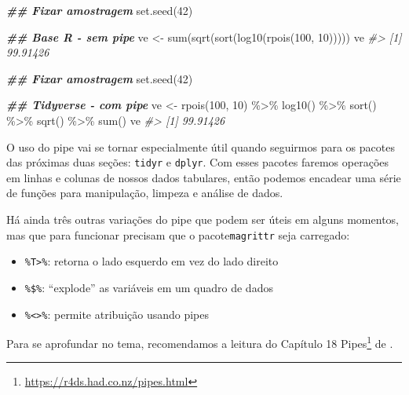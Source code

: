 \documentclass[
]{book}
\newenvironment{Shaded}{\begin{snugshade}}{\end{snugshade}}
\newcommand{\CommentTok}[1]{\textcolor[rgb]{0.37,0.37,0.37}{\textit{#1}}}
\newcommand{\DecValTok}[1]{\textcolor[rgb]{0.06,0.06,0.06}{#1}}
\newcommand{\DocumentationTok}[1]{\textcolor[rgb]{0.37,0.37,0.37}{\textbf{\textit{#1}}}}
\newcommand{\FunctionTok}[1]{\textcolor[rgb]{0,0,0}{#1}}
\newcommand{\NormalTok}[1]{#1}
\newcommand{\OtherTok}[1]{\textcolor[rgb]{0.37,0.37,0.37}{#1}}
\newcommand{\SpecialCharTok}[1]{\textcolor[rgb]{0,0,0}{#1}}
\providecommand{\tightlist}{%
  \setlength{\itemsep}{0pt}\setlength{\parskip}{0pt}}
\renewcommand{\href}[2]{#2\footnote{\url{#1}}}
\begin{document}
\begin{Shaded}
\begin{Highlighting}[]
\DocumentationTok{\#\# Fixar amostragem}
\FunctionTok{set.seed}\NormalTok{(}\DecValTok{42}\NormalTok{)}

\DocumentationTok{\#\# Base R {-} sem pipe}
\NormalTok{ve }\OtherTok{\textless{}{-}} \FunctionTok{sum}\NormalTok{(}\FunctionTok{sqrt}\NormalTok{(}\FunctionTok{sort}\NormalTok{(}\FunctionTok{log10}\NormalTok{(}\FunctionTok{rpois}\NormalTok{(}\DecValTok{100}\NormalTok{, }\DecValTok{10}\NormalTok{)))))}
\NormalTok{ve}
\CommentTok{\#\textgreater{} [1] 99.91426}

\DocumentationTok{\#\# Fixar amostragem}
\FunctionTok{set.seed}\NormalTok{(}\DecValTok{42}\NormalTok{)}

\DocumentationTok{\#\# Tidyverse {-} com pipe}
\NormalTok{ve }\OtherTok{\textless{}{-}} \FunctionTok{rpois}\NormalTok{(}\DecValTok{100}\NormalTok{, }\DecValTok{10}\NormalTok{) }\SpecialCharTok{\%\textgreater{}\%} 
  \FunctionTok{log10}\NormalTok{() }\SpecialCharTok{\%\textgreater{}\%}
  \FunctionTok{sort}\NormalTok{() }\SpecialCharTok{\%\textgreater{}\%} 
  \FunctionTok{sqrt}\NormalTok{() }\SpecialCharTok{\%\textgreater{}\%} 
  \FunctionTok{sum}\NormalTok{()}
\NormalTok{ve}
\CommentTok{\#\textgreater{} [1] 99.91426}
\end{Highlighting}
\end{Shaded}

O uso do pipe vai se tornar especialmente útil quando seguirmos para os pacotes das próximas duas seções: \texttt{tidyr} e \texttt{dplyr}. Com esses pacotes faremos operações em linhas e colunas de nossos dados tabulares, então podemos encadear uma série de funções para manipulação, limpeza e análise de dados.

Há ainda três outras variações do pipe que podem ser úteis em alguns momentos, mas que para funcionar precisam que o pacote\texttt{magrittr} seja carregado:

\begin{itemize}
\tightlist
\item
  \texttt{\%T\textgreater{}\%}: retorna o lado esquerdo em vez do lado direito
\item
  \texttt{\%\$\%}: ``explode'' as variáveis em um quadro de dados
\item
  \texttt{\%\textless{}\textgreater{}\%}: permite atribuição usando pipes
\end{itemize}

Para se aprofundar no tema, recomendamos a leitura do Capítulo \href{https://r4ds.had.co.nz/pipes.html}{18 Pipes} de \citet{wickham2017}.
\end{document}

